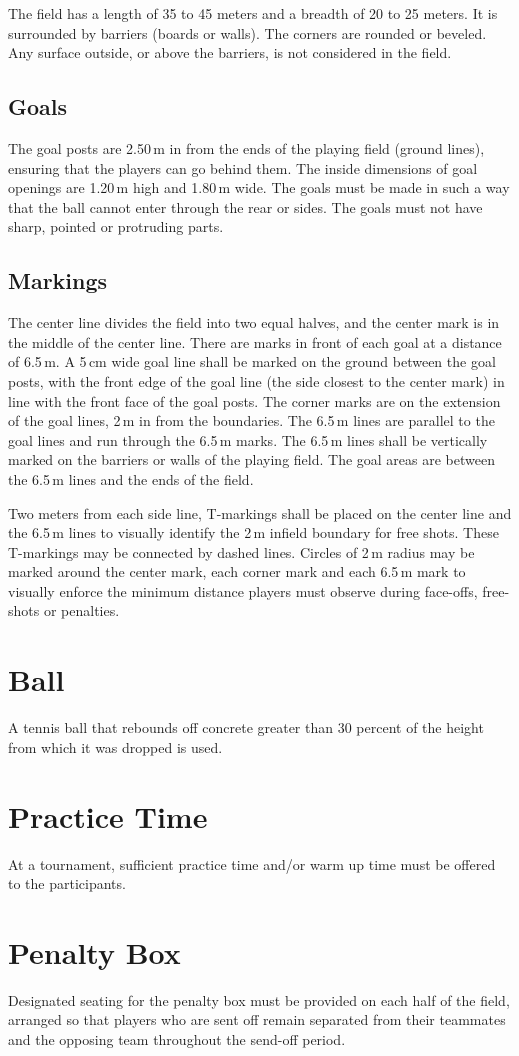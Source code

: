 

The field has a length of 35 to 45 meters and a breadth of 20 to 25 meters.
It is surrounded by barriers (boards or walls).
The corners are rounded or beveled.
Any surface outside, or above the barriers, is not considered in the field.

\subsection{Goals}
The goal posts are 2.50\,m in from the ends of the playing field (ground lines), ensuring that the players can go behind them.
The inside dimensions of goal openings are 1.20\,m high and 1.80\,m wide.
The goals must be made in such a way that the ball cannot enter through the rear or sides.
The goals must not have sharp, pointed or protruding parts.

\subsection{Markings}
The center line divides the field into two equal halves, and the center mark is in the middle of the center line.
There are marks in front of each goal at a distance of 6.5\,m.
A 5\,cm wide goal line shall be marked on the ground between the goal posts, with the front edge of the goal line (the side closest to the center mark) in line with the front face of the goal posts.
The corner marks are on the extension of the goal lines, 2\,m in from the boundaries.
The 6.5\,m lines are parallel to the goal lines and run through the 6.5\,m marks.
The 6.5\,m lines shall be vertically marked on the barriers or walls of the playing field.
The goal areas are between the 6.5\,m lines and the ends of the field.

Two meters from each side line, T-markings shall be placed on the center line and the 6.5\,m lines to visually identify the 2\,m infield boundary for free shots.
These T-markings may be connected by dashed lines.
Circles of 2\,m radius may be marked around the center mark, each corner mark and each 6.5\,m mark to visually enforce the minimum distance players must observe during face-offs, free-shots or penalties.

\section{Ball}
A tennis ball that rebounds off concrete greater than 30 percent of the height from which it was dropped is used.

\section{Practice Time}
At a tournament, sufficient practice time and/or warm up time must be offered to the participants.

\section{Penalty Box}
Designated seating for the penalty box must be provided on each half of the field, arranged so that players who are sent off remain separated from their teammates and the opposing team throughout the send-off period.